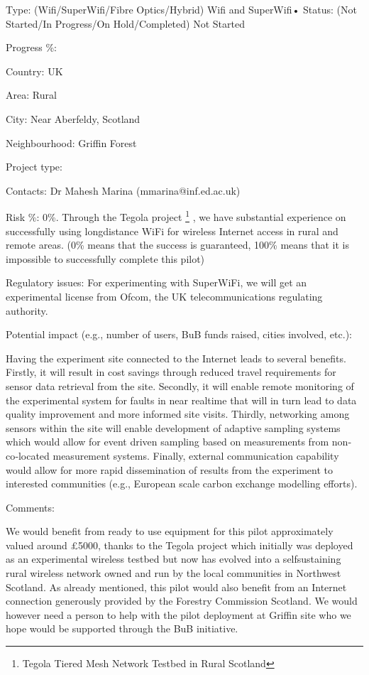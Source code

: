\documentclass[draftclsnofoot,12pt,journal,onecolumn]{IEEEtran}
\begin{document}
Type: (Wifi/SuperWifi/Fibre Optics/Hybrid) Wifi and SuperWifi• Status: (Not Started/In Progress/On Hold/Completed) Not Started

Progress \%:

Country: UK

Area: Rural

City: Near Aberfeldy, Scotland

Neighbourhood: Griffin Forest

Project type:

Contacts: Dr Mahesh Marina (mmarina@inf.ed.ac.uk)

Risk \%: 0\%. Through the Tegola project \footnote{Tegola Tiered Mesh Network Testbed in Rural Scotland} , we have substantial experience on successfully
using long­distance WiFi for wireless Internet access in rural and remote areas.
(0\% means that the success is guaranteed, 100\% means that it is
impossible to successfully complete this pilot)

Regulatory issues: For experimenting with SuperWiFi, we will get an experimental license from
Ofcom, the UK telecommunications regulating authority.

Potential impact (e.g., number of users, BuB funds raised, cities
involved, etc.):

Having the experiment site connected to the Internet leads to several benefits. Firstly, it will result
in cost savings through reduced travel requirements for sensor data retrieval from the site.
Secondly, it will enable remote monitoring of the experimental system for faults in near real­time
that will in turn lead to data quality improvement and more informed site visits. Thirdly,
networking among sensors within the site will enable development of adaptive sampling systems
which would allow for event driven sampling based on measurements from non‐co‐located
measurement systems. Finally, external communication capability would allow for more rapid
dissemination of results from the experiment to interested communities (e.g., European scale
carbon exchange modelling efforts).

Comments:

We would benefit from ready to use equipment for this pilot approximately valued around £5000,
thanks to the Tegola project which initially was deployed as an experimental wireless testbed but
now has evolved into a self­sustaining rural wireless network owned and run by the local
communities in Northwest Scotland. As already mentioned, this pilot would also benefit from an
Internet connection generously provided by the Forestry Commission Scotland. We would
however need a person to help with the pilot deployment at Griffin site who we hope would be
supported through the BuB initiative.
\end{document}
